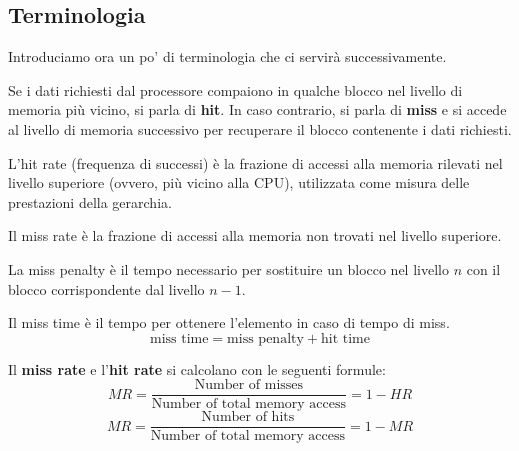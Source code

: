 \subsection{Terminologia}
Introduciamo ora un po' di terminologia che ci servirà successivamente.

\begin{definition}
Se i dati richiesti dal processore compaiono in qualche blocco nel livello di memoria più vicino, si parla di \textbf{hit}. In caso contrario, si parla di \textbf{miss} e si accede al livello di memoria successivo per recuperare il blocco contenente i dati richiesti.
\end{definition}

\begin{definition}
    L'hit rate (frequenza di successi) è la frazione di accessi alla memoria rilevati nel livello superiore (ovvero, più vicino alla CPU), utilizzata come misura delle prestazioni della gerarchia.
\end{definition}

\begin{definition}
    Il miss rate è la frazione di accessi alla memoria non trovati nel livello superiore.
\end{definition}

\begin{definition}
    La miss penalty è il tempo necessario per sostituire un blocco nel livello $n$ con il blocco corrispondente dal livello $n-1$.
\end{definition}

\begin{definition}
    Il miss time è il tempo per ottenere l'elemento in caso di tempo di miss. 
    \begin{equation*}
    	\text{miss time} = \text{miss penalty} + \text{hit time}
    \end{equation*}
\end{definition}

\noindent Il \textbf{miss rate} e l'\textbf{hit rate} si calcolano con le seguenti formule:
\begin{equation}
    MR = \frac{\text{Number of misses}}{\text{Number of total memory access}} = 1 - HR
\end{equation}
\begin{equation}
    MR = \frac{\text{Number of hits}}{\text{Number of total memory access}} = 1 - MR
\end{equation}

